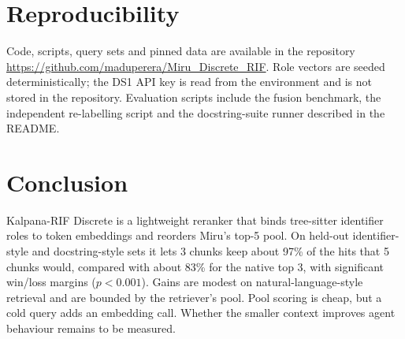 \documentclass[11pt, a4paper]{article}
\begin{document}
\section{Reproducibility}
Code, scripts, query sets and pinned data are available in the repository \url{https://github.com/maduperera/Miru_Discrete_RIF}. Role vectors are seeded deterministically; the DS1 API key is read from the environment and is not stored in the repository. Evaluation scripts include the fusion benchmark, the independent re-labelling script and the docstring-suite runner described in the README.

\section{Conclusion}
Kalpana-RIF Discrete is a lightweight reranker that binds tree-sitter identifier roles to token embeddings and reorders Miru's top-5 pool. On held-out identifier-style and docstring-style sets it lets 3 chunks keep about 97\% of the hits that 5 chunks would, compared with about 83\% for the native top 3, with significant win/loss margins ($p<0.001$). Gains are modest on natural-language-style retrieval and are bounded by the retriever's pool. Pool scoring is cheap, but a cold query adds an embedding call. Whether the smaller context improves agent behaviour remains to be measured.
\end{document}
